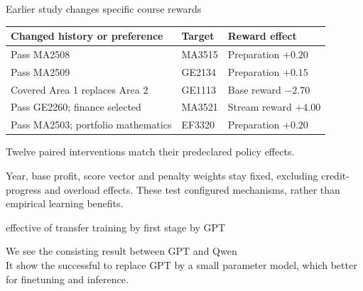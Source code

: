 \documentclass[aspectratio=169,11pt]{beamer}
\newcommand{\smallnote}[1]{\par{\footnotesize\color{muted}#1\par}}
\begin{document}
\begin{frame}{Earlier study changes specific course rewards}
\small
\begin{tabular}{L{6.3cm}L{2cm}L{3.5cm}}
\toprule
Changed history or preference & Target & Reward effect\\\midrule
Pass MA2508 & MA3515 & Preparation $+0.20$\\[6pt]
Pass MA2509 & GE2134 & Preparation $+0.15$\\[6pt]
Covered Area 1 replaces Area 2 & GE1113 & Base reward $-2.70$\\[6pt]
Pass GE2260; finance selected & MA3521 & Stream reward $+4.00$\\[6pt]
Pass MA2503; portfolio mathematics & EF3320 & Preparation $+0.20$\\
\bottomrule
\end{tabular}\par
\vspace{3mm}
\normalsize Twelve paired interventions match their predeclared policy effects.
\smallnote{Year, base profit, score vector and penalty weights stay fixed, excluding credit-progress and overload effects. These test configured mechanisms, rather than empirical learning benefits.}
\end{frame}

\begin{frame}{effective of transfer training by first stage by GPT}

We see the consisting result between GPT and Qwen\\
It show the successful to replace GPT by a small parameter model, which better for finetuning and inference.
\end{frame}
\end{document}
